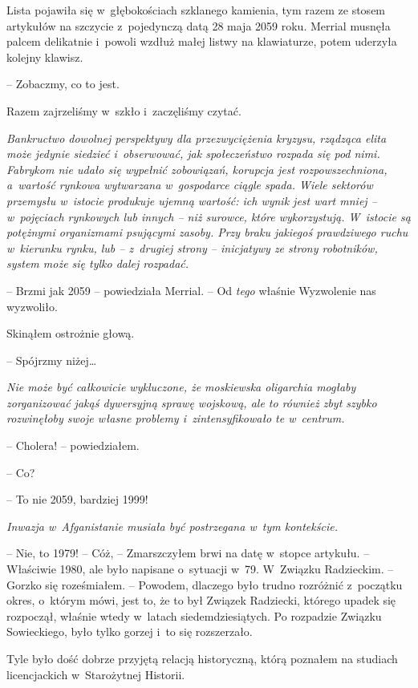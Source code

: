 \documentclass[oneside,polish,11pt,sfheadings]{mwbk}
\begin{document}
Lista pojawiła się w~głębokościach szklanego kamienia, tym razem ze
stosem artykułów na szczycie z~pojedynczą datą 28 maja 2059 roku.
Merrial musnęła palcem delikatnie i~powoli wzdłuż małej listwy na
klawiaturze, potem uderzyła kolejny klawisz. 

-- Zobaczmy, co to jest.

Razem zajrzeliśmy w~szkło i~zaczęliśmy czytać.

\textit{Bankructwo dowolnej perspektywy dla przezwyciężenia kryzysu, rządząca
elita może jedynie siedzieć i~obserwować, jak społeczeństwo rozpada się
pod nimi. Fabrykom nie udało się wypełnić zobowiązań, korupcja jest
rozpowszechniona, a~wartość rynkowa wytwarzana w~gospodarce ciągle
spada. Wiele sektorów przemysłu w~istocie produkuje ujemną wartość: ich
wynik jest wart mniej -- w~pojęciach rynkowych lub innych -- niż surowce,
które wykorzystują. W~istocie są potężnymi organizmami psującymi zasoby.
Przy braku jakiegoś prawdziwego ruchu w~kierunku rynku, lub -- z~drugiej
strony -- inicjatywy ze strony robotników, system może się tylko dalej
rozpadać.}

-- Brzmi jak 2059 -- powiedziała Merrial. -- Od \textit{tego} właśnie
Wyzwolenie nas wyzwoliło.

Skinąłem ostrożnie głową. 

-- Spójrzmy niżej\ldots

\textit{Nie może być całkowicie wykluczone, że moskiewska oligarchia mogłaby
zorganizować jakąś dywersyjną sprawę wojskową, ale to również zbyt
szybko rozwinęłoby swoje własne problemy i~zintensyfikowało te w~centrum.}


-- Cholera! -- powiedziałem.

-- Co?

-- To nie 2059, bardziej 1999!

\textit{Inwazja w~Afganistanie musiała być postrzegana w~tym kontekście.}

-- Nie, to 1979! -- Cóż, -- Zmarszczyłem brwi na datę w~stopce artykułu. -- Właściwie 1980, ale było napisane o~sytuacji w~79. W~Związku
Radzieckim. -- Gorzko się roześmiałem. -- Powodem, dlaczego było trudno
rozróżnić z~początku okres, o~którym mówi, jest to, że to był Związek
Radziecki, którego upadek się rozpoczął, właśnie wtedy w~latach
siedemdziesiątych. Po rozpadzie Związku Sowieckiego, było tylko gorzej i~to się rozszerzało.

Tyle było dość dobrze przyjętą relacją historyczną, którą poznałem na
studiach licencjackich w~Starożytnej Historii.
\end{document}
